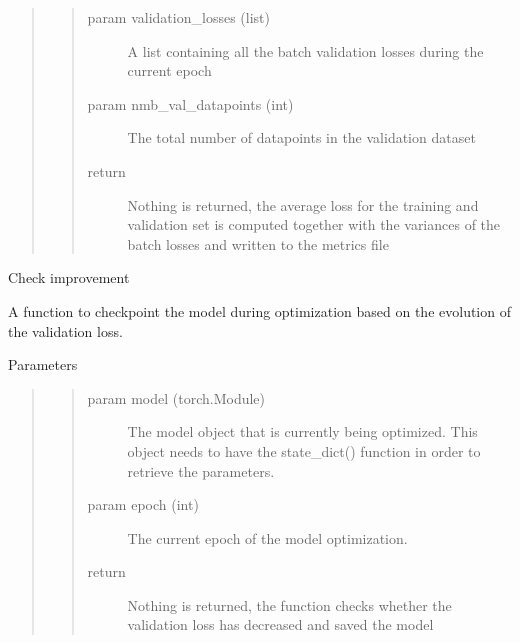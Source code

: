 \documentclass[letterpaper,10pt,english]{sphinxmanual}
\begin{document}
\begin{fulllineitems}
\begin{fulllineitems}
\begin{quote}
\begin{quote}
\begin{description}
\item[{param validation\_losses (list)}] \leavevmode
A list containing all the batch validation losses during the current epoch

\item[{param nmb\_val\_datapoints (int)}] \leavevmode
The total number of datapoints in the validation dataset

\item[{return}] \leavevmode
Nothing is returned, the average loss for the training and validation set is computed together with
the variances of the batch losses and written to the metrics file

\end{description}\end{quote}
\end{quote}

\end{fulllineitems}


\begin{fulllineitems}
\label{\detokenize{modules/gqcml.utils:gqcml.utils.train.model_logger.check_improvement}}
Check improvement

A function to checkpoint the model during optimization based on the evolution of the validation loss.

Parameters
\begin{quote}
\begin{quote}\begin{description}
\item[{param model (torch.Module)}] \leavevmode
The model object that is currently being optimized. This object needs to have
the state\_dict() function in order to retrieve the parameters.

\item[{param epoch (int)}] \leavevmode
The current epoch of the model optimization.

\item[{return}] \leavevmode
Nothing is returned, the function checks whether the validation loss has decreased and saved the model

\end{description}\end{quote}
\end{quote}


\end{fulllineitems}
\end{fulllineitems}
\end{document}
